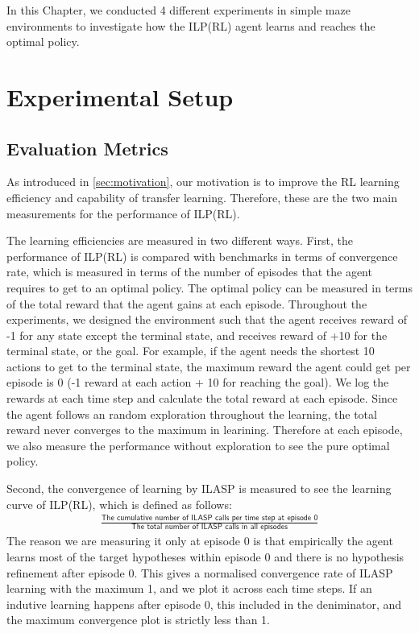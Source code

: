 In this Chapter, we conducted 4 different experiments in simple maze environments to investigate how the ILP(RL) agent learns and reaches the optimal policy.

\section{Experimental Setup}
\label{sec:experimental_setup}

\subsection{Evaluation Metrics}
\label{subsec:evaluation_metrics}

As introduced in \ref{sec:motivation}, our motivation is to improve the RL learning efficiency and capability of transfer learning.
Therefore, these are the two main measurements for the performance of ILP(RL).

The learning efficiencies are measured in two different ways. First, the performance of ILP(RL) is compared with benchmarks in terms of
convergence rate, which is measured in terms of the number of episodes that the agent requires to get to an optimal policy.
The optimal policy can be measured in terms of the total reward that the agent gains at each episode. 
Throughout the experiments, we designed the environment such that the agent receives reward of -1 for any state except the terminal state, and receives reward of +10 for the terminal state, or the goal.
For example, if the agent needs the shortest 10 actions to get to the terminal state, the maximum reward the agent could get per episode is 0 (-1 reward at each action + 10 for reaching the goal).
We log the rewards at each time step and calculate the total reward at each episode. 
Since the agent follows an random exploration throughout the learning, the total reward never converges to the maximum in learining. 
Therefore at each episode, we also measure the performance without exploration to see the pure optimal policy.

Second, the convergence of learning by ILASP is measured to see the learning curve of ILP(RL), which is defined as follows:
\begin{equation}
\begin{split}
\frac{\textsf{The cumulative number of ILASP calls per time step at episode 0}}{\textsf{The total number of ILASP calls in all episodes}}
\end{split}
\end{equation}
The reason we are measuring it only at episode 0 is that empirically the agent learns most of the target hypotheses within episode 0 and there is no hypothesis refinement after episode 0.
This gives a normalised convergence rate of ILASP learning with the maximum 1, and we plot it across each time steps. 
If an indutive learning happens after episode 0, this included in the deniminator, and the maximum convergence plot is strictly less than 1.

